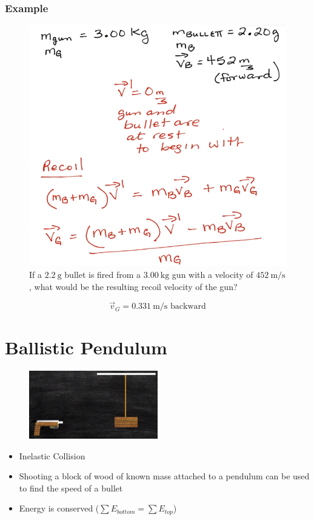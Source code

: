 \documentclass[a4paper,12pt]{article}
\begin{document}
\subsubsection{Example}
\begin{figure}[H]
    \centering
    \caption{If a $\SI{2.2}{\g}$ bullet is fired from a $\SI{3.00}{\kg}$ gun with a velocity of $\SI{452}{\m/\s}$, what would be the resulting recoil velocity of the gun?}
    \includegraphics[width=\textwidth]{q-recoil-1}
\end{figure}
$$\vec{v}_G = \SI{0.331}{\m/\s}\textrm{ backward}$$

\pagebreak

\section{Ballistic Pendulum}
\begin{figure}[H]
    \centering
    \includegraphics[width=0.50\textwidth]{ballistic}
\end{figure}
\begin{itemize}
    \item{Inelastic Collision}
    \item{Shooting a block of wood of known mass attached to a pendulum can be used to find the speed of a bullet}
    \item{Energy is conserved ($\sum{E_{bottom}} = \sum{E_{top}}$)}
\end{itemize}
\end{document}
